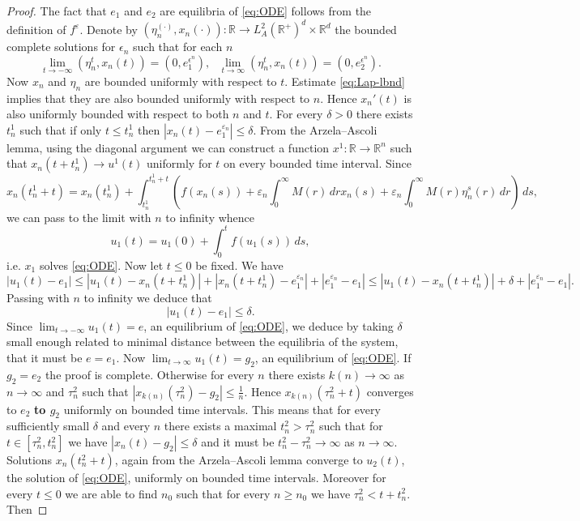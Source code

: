\documentclass[11pt, leqno]{amsart}
\theoremstyle{definition}
\def\R{\mathbb{R}}
\begin{document}
\begin{proof}
	The fact that $e_1$ and $e_2$ are equilibria of \eqref{eq:ODE} follows from the definition of $f^\varepsilon$.
	Denote by $(\eta_n^{(\cdot)},x_n(\cdot)):\R\to L^2_A(\R^+)^d\times \R^d$ the bounded complete solutions for $\epsilon_n$ such that for each $n$
	$$
	\lim_{t\to -\infty} (\eta_n^t,x_n(t)) = (0,e_1^{\epsilon^n}), \ \ \ 	\lim_{t\to \infty} (\eta_n^t,x_n(t)) = (0,e_2^{\epsilon^n}).
	$$
	Now $x_n$ and $\eta_n$ are bounded uniformly with respect to $t$. Estimate \eqref{eq:Lap-lbnd} implies that they are also bounded uniformly with respect to $n$. Hence $x_n'(t)$ is also uniformly bounded with respect to both $n$ and $t$.
	For every $\delta > 0$ there exists $t_n^1$ such that if only $t\leq t_n^1$ then $|x_n(t) - e_1^{\varepsilon_n}| \leq \delta$. From the Arzela--Ascoli lemma, using the diagonal argument we can construct a function $x^1:\R\to \R^n$ such that $x_n(t+t_n^1)\to u^1(t)$ uniformly for $t$ on every bounded time interval. Since
	$$
	x_n(t_n^1+t) = x_n(t_n^1) + \int_{t_n^1}^{t_n^1+t} \left(f(x_n(s)) + \varepsilon_n \int_{0}^\infty M(r)\, dr x_n(s) + \varepsilon_n \int_0^\infty M(r)\eta_n^s(r)\, dr\right) \, ds,
	$$
	we can pass to the limit with $n$ to infinity whence
	$$
	u_1(t) = u_1(0) + \int_0^t f(u_1(s))\, ds,
	$$
	i.e. $x_1$ solves \eqref{eq:ODE}. Now let $t \leq 0$ be fixed. We have
	$$
	|u_1(t) - e_1| \leq |u_1(t) - x_n(t+t_n^1)| + |x_n(t+t_n^1) - e_1^{\varepsilon_n}| + |e_1^{\varepsilon_n}- e_1| \leq |u_1(t) - x_n(t+t_n^1)| + \delta + |e_1^{\varepsilon_n}- e_1|.
	$$
	Passing with $n$ to infinity we deduce that
	$$
	|u_1(t) - e_1| \leq \delta.
	$$
	Since $\lim_{t\to -\infty} u_1(t) = e$, an equilibrium of \eqref{eq:ODE}, we deduce by taking $\delta$ small enough related to minimal distance between the equilibria of the system, that it must be $e = e_1$.
		Now $\lim_{t\to \infty}u_1(t) = g_2$, an equilibrium of \eqref{eq:ODE}. If $g_2=e_2$ the proof is complete. Otherwise for every $n$ there exists $k(n) \to \infty$ as  $n \to \infty$ and $\tau^2_{n}$ such that $|x_{k(n)}(\tau^2_n) - g_2|\leq \frac{1}{n}$.  Hence $x_{k(n)}(\tau^2_n+t)$ converges to $e_2$ \textbf{to $g_2$} uniformly on bounded time intervals. This means that for every sufficiently small $\delta$ and every $n$ there exists a maximal $t^2_n>\tau^2_n$ such that for $t\in [\tau^2_n,t^2_n]$ we have $|x_n(t)-g_2|\leq \delta$ and it must be $t^2_n-\tau^2_n \to \infty$ as $n\to \infty$.  Solutions $x_n(t_n^2+t)$, again from the Arzela--Ascoli lemma converge to $u_2(t)$, the solution of \eqref{eq:ODE}, uniformly on bounded time intervals. Moreover for every $t\leq 0$ we are able to find $n_0$ such that for every $n\geq n_0$ we have $\tau_n^2 < t+t_n^2$. Then

\end{proof}
\end{document}
